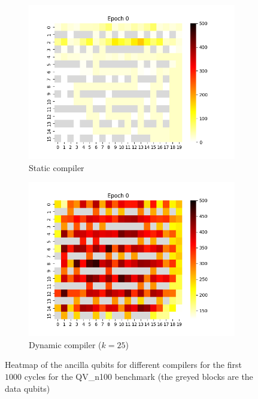 \begin{figure}
    \centering
    \begin{subfigure}{\columnwidth}
        \includegraphics[width=0.9\linewidth]{figs/heatmap_static.png}
        \caption{Static compiler}
    \end{subfigure}
    \begin{subfigure}{\columnwidth}
        \includegraphics[width=0.9\linewidth]{figs/heatmap_dynamic.png}
        \caption{Dynamic compiler ($k = 25$)}
    \end{subfigure}
    \caption{Heatmap of the ancilla qubits for different compilers for the first $1000$ cycles for the QV\_n100 benchmark (the greyed blocks are the data qubits)}
    \label{fig:heatmap}
\end{figure}

